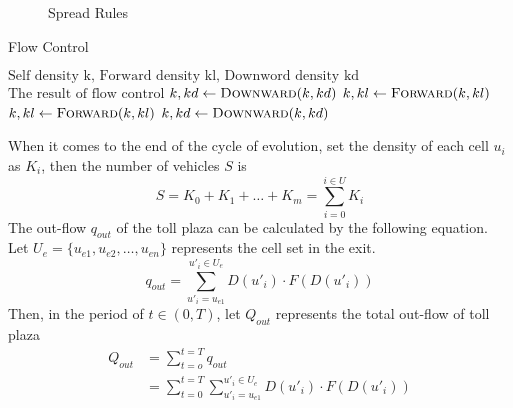 \documentclass{mcmthesis}
\begin{document}
\begin{figure}[!htbp]
	\centering
	 \hspace{.3\textwidth}
	\caption{Spread Rules}
	\label{fig:sp_exm}
\end{figure}
\begin{algorithm}
	\begin{algorithmic}
	\caption{\label{alg:flow_ctl}Flow Control}
        \Require $\text{Self density k, Forward density kl, Downword density kd}$
		\Ensure $\text{The result of flow control}$
					\State $k,kd \gets \Call{Downward}{k,kd}$
					\State $k,kl \gets \Call{Forward}{k,kl}$
				\Else
					\State $k,kl \gets \Call{Forward}{k,kl}$
					\State $k,kd \gets \Call{Downward}{k,kd}$
			\EndIf
			\State {}
		\EndFunction
\end{algorithmic}
\end{algorithm}
When it comes to the end of the cycle of evolution, set the density of each cell $u_i$ as $K_i$, then the number of vehicles $S$ is
\begin{equation}
	S=K_0+K_1+\dots+K_m=\sum_{i=0}^{i \in U} K_i
\end{equation}
The out-flow $q_{out}$ of the toll plaza can be calculated by the following equation. Let $U_e=\{u_{e1},u_{e2},\dots,u_{en}\}$ represents the cell set in the exit.
\begin{equation}
	q_{out}=\sum_{u'_i=u_{e1}}^{u'_i\in U_e}D(u'_i) \cdot F(D(u'_i) )
\end{equation}
Then, in the period of $ t\in (0,T)$, let $Q_{out}$ represents the total out-flow of toll plaza
\begin{equation}
	\begin{split}
	Q_{out}&=\sum_{t=o}^{t=T}q_{out}\\
	&=\sum_{t=0}^{t=T}\sum_{u'_i=u_{e1}}^{u'_i\in U_e}D(u'_i) \cdot F(D(u'_i) )
	\end{split}
\end{equation}
\end{document}
